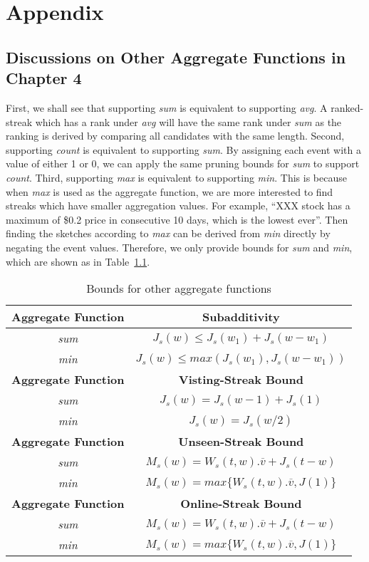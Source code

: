 \chapter{Appendix}
\section{Discussions on Other Aggregate Functions in Chapter 4}
\label{sec:discussion}
First, we shall see that supporting \emph{sum} is equivalent
to supporting \emph{avg}. 
A ranked-streak which has a rank under \emph{avg} will have the 
same rank under \emph{sum} as the ranking is derived by comparing all 
candidates with the same length. 
%
Second, supporting \emph{count} is equivalent to supporting \emph{sum}. 
By assigning each event with a value of either 1 or 0, we can apply the 
same pruning bounds for \emph{sum} to support \emph{count}. 
%
Third, supporting \emph{max} is equivalent to supporting \emph{min}. This is 
because when \emph{max} is used as the aggregate function, we are more interested 
to find streaks which have smaller aggregation values. 
For example, ``XXX stock has a maximum of \$0.2 price
in consecutive 10 days, which is the lowest ever''. Then finding the sketches according to \emph{max} 
can be derived from \emph{min} directly by negating the event values. 
Therefore, we only provide bounds for 
\emph{sum} and \emph{min}, which are shown as in Table~\ref{tbl:agg_bound}.
%
\begin{table}[h]
\caption{Bounds for other aggregate functions}
\centering
\begin{tabular}{|c|c|}
\hline 
\textbf{Aggregate Function} & \textbf{Subadditivity} \\
\hline 
\emph{sum} & $J_s(w) \leq J_s(w_1) + J_s(w-w_1) $ \\
\emph{min} & $J_s(w) \leq max(J_s(w_1), J_s(w-w_1))$ \\
\hline 
\textbf{Aggregate Function} & \textbf{Visting-Streak Bound} \\
\hline 
\emph{sum} & $J_s(w) = J_s(w-1)+J_s(1)$ \\
\emph{min} & $J_s(w) = J_s(w/2)$ \\
\hline 
\textbf{Aggregate Function}& \textbf{Unseen-Streak Bound} \\
\hline 
\emph{sum} & $M_s(w) = W_s(t,w).\overline{v} + J_s(t-w)$ \\
\emph{min} & $M_s(w) = max\{W_s(t,w).\overline{v}, J(1)\}$ \\
\hline 
\textbf{Aggregate Function }& \textbf{Online-Streak Bound} \\
\hline 
\emph{sum} & $M_s(w) = W_s(t,w).\overline{v} + J_s(t-w)$ \\
\emph{min} & $M_s(w) = max\{W_s(t,w).\overline{v}, J(1)\}$ \\
\hline 
\end{tabular} 
\label{tbl:agg_bound}
\end{table}

